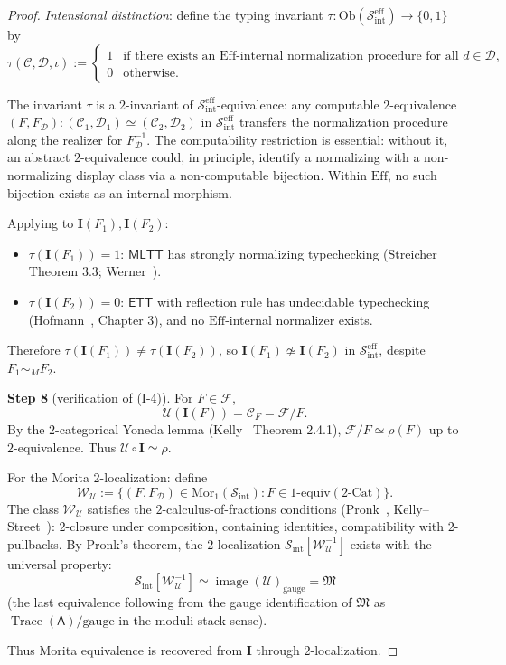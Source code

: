 \documentclass[11pt]{article}
\theoremstyle{plain}
\theoremstyle{definition}
\newcommand{\cS}{\mathcal{S}}
\newcommand{\cF}{\mathcal{F}}
\newcommand{\cC}{\mathcal{C}}
\newcommand{\cD}{\mathcal{D}}
\newcommand{\fM}{\mathfrak{M}}
\newcommand{\Sint}{\cS_{\mathrm{int}}}
\newcommand{\Ob}{\mathrm{Ob}}
\newcommand{\Mor}{\mathrm{Mor}}
\newcommand{\Cat}{\mathrm{Cat}}
\newcommand{\MLTT}{\mathsf{MLTT}}
\newcommand{\ETT}{\mathsf{ETT}}
\newcommand{\II}{\mathbf{I}}
\newcommand{\cU}{\mathcal{U}}
\DeclareMathOperator{\image}{image}
\DeclareMathOperator{\Trace}{Trace}
\begin{document}
\begin{proof}
\emph{Intensional distinction}: define the typing invariant $\tau : \Ob(\Sint^{\mathrm{eff}}) \to \{0, 1\}$ by
\[ \tau(\cC, \cD, \iota) := \begin{cases} 1 & \text{if there exists an $\mathrm{Eff}$-internal normalization procedure for all } d \in \cD, \\ 0 & \text{otherwise.} \end{cases} \]

The invariant $\tau$ is a $2$-invariant of $\Sint^{\mathrm{eff}}$-equivalence: any computable $2$-equivalence $(F, F_\cD) : (\cC_1, \cD_1) \simeq (\cC_2, \cD_2)$ in $\Sint^{\mathrm{eff}}$ transfers the normalization procedure along the realizer for $F_\cD^{-1}$. The computability restriction is essential: without it, an abstract $2$-equivalence could, in principle, identify a normalizing with a non-normalizing display class via a non-computable bijection. Within $\mathrm{Eff}$, no such bijection exists as an internal morphism.

Applying to $\II(F_1), \II(F_2)$:
\begin{itemize}
\item $\tau(\II(F_1)) = 1$: $\MLTT$ has strongly normalizing typechecking (Streicher~\cite{Streicher1991} Theorem 3.3; Werner~\cite{Werner1994}).
\item $\tau(\II(F_2)) = 0$: $\ETT$ with reflection rule has undecidable typechecking (Hofmann~\cite{Hofmann1995}, Chapter 3), and no $\mathrm{Eff}$-internal normalizer exists.
\end{itemize}

Therefore $\tau(\II(F_1)) \neq \tau(\II(F_2))$, so $\II(F_1) \not\simeq \II(F_2)$ in $\Sint^{\mathrm{eff}}$, despite $F_1 \sim_M F_2$.

\textbf{Step 8} (verification of (I-4)). For $F \in \cF$,
\[ \cU(\II(F)) = \cC_F = \cF / F. \]
By the $2$-categorical Yoneda lemma (Kelly~\cite{Kelly1982} Theorem 2.4.1), $\cF / F \simeq \rho(F)$ up to $2$-equivalence. Thus $\cU \circ \II \simeq \rho$.

For the Morita $2$-localization: define
\[ \mathcal{W}_\cU := \{(F, F_\cD) \in \Mor_1(\Sint) : F \in 1\text{-equiv}(2\text{-}\Cat)\}. \]
The class $\mathcal{W}_\cU$ satisfies the $2$-calculus-of-fractions conditions (Pronk~\cite{Pronk1996}, Kelly--Street~\cite{KellyStreet1974}): $2$-closure under composition, containing identities, compatibility with $2$-pullbacks. By Pronk's theorem, the $2$-localization $\Sint[\mathcal{W}_\cU^{-1}]$ exists with the universal property:
\[ \Sint[\mathcal{W}_\cU^{-1}] \simeq \image(\cU)_{\mathrm{gauge}} = \fM \]
(the last equivalence following from the gauge identification of $\fM$ as $\Trace(\mathsf{A})/\mathrm{gauge}$ in the moduli stack sense).

Thus Morita equivalence is recovered from $\II$ through $2$-localization.
\end{proof}
\end{document}
